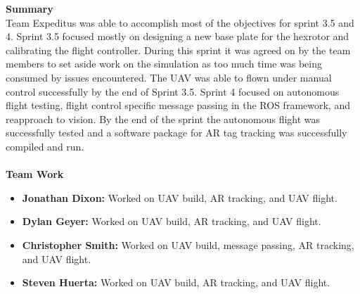 \noindent \Large{\textbf{Summary}}\\
\normalsize Team Expeditus was able to accomplish most of the objectives for sprint 3.5 and 4. Sprint 3.5 focused mostly on designing a new base plate for the hexrotor and calibrating the flight controller. During this sprint it was agreed on by the team members to set aside work on the simulation as too much time was being consumed by issues encountered. The UAV was able to flown under manual control successfully by the end of Sprint 3.5. Sprint 4 focused on autonomous flight testing, flight control specific message passing in the ROS framework, and reapproach to vision. By the end of the sprint the autonomous flight was successfully tested and a software package for AR tag tracking was successfully compiled and run.\\
\vspace{5mm}
\\
\noindent \Large{\textbf{Team Work}}
\normalsize
\begin{itemize}
\item \textbf{Jonathan Dixon:} Worked on UAV build, AR tracking, and UAV flight.
\item \textbf{Dylan Geyer:} Worked on UAV build, AR tracking, and UAV flight.
\item \textbf{Christopher Smith:} Worked on UAV build, message passing, AR tracking, and UAV flight. 
\item \textbf{Steven Huerta:} Worked on UAV build, AR tracking, and UAV flight. 
\end{itemize}

